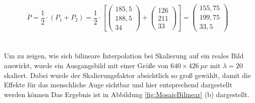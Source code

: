 \documentclass[
fontsize=10pt, 
listof = totoc,
parskip = half	
]{report}
\begin{document}
\begin{equation}
	\dot{P} =	\frac{1}{2} \cdot \left(P_1 + P_2\right) =
				\frac{1}{2}\cdot
				\left[
				\begin{pmatrix}
					185,5\\
					188,5\\
					34
				\end{pmatrix}
				+
				\begin{pmatrix}
					126\\
					211\\
					33
				\end{pmatrix}
				\right]
				=
				\begin{pmatrix}
					155,75\\
					199,75\\
					33,5
				\end{pmatrix}
\end{equation}
\\\\
\noindent Um zu zeigen, wie sich bilineare Interpolation bei Skalierung auf ein reales Bild auswirkt, wurde ein Ausgangsbild mit einer Größe von $640\times 426~px$ mit $\lambda = 20$ skaliert. Dabei wurde der Skalierungsfaktor absichtlich so groß gewählt, damit die Effekte für das menschliche Auge sichtbar und hier entsprechend dargestellt werden können Das Ergebnis ist in Abbildung \ref{fig:MosaicBilinear} (b) dargestellt.
\\
\end{document}
